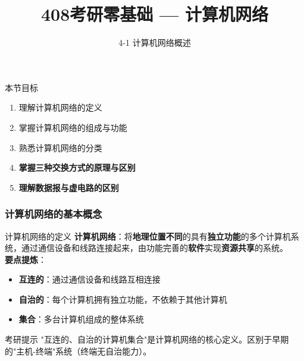 \documentclass[10pt, aspectratio=169]{beamer}
\title{408考研零基础 --- 计算机网络}
\subtitle{4-1 计算机网络概述}
\author{}
\date{}
\begin{document}
\begin{frame}{本节目标}
    \begin{enumerate}
        \item 理解计算机网络的定义
        \item 掌握计算机网络的组成与功能
        \item 熟悉计算机网络的分类
        \item \textbf{掌握三种交换方式{的}原理与区别}
        \item \textbf{理解数据报与虚电路{的}区别}
    \end{enumerate}
\end{frame}

\subsubsection{计算机网络的基本概念}
\begin{frame}{计算机网络的定义}
    \textbf{计算机网络}：将\textbf{地理位置不同}的具有\textbf{独立功能}的多个计算机系统，通过通信设备和线路连接起来，由功能完善的\textbf{软件}实现\textbf{资源共享}的系统。\\
    \vspace{0.5em}
    \textbf{要点提炼}：
    \begin{itemize}
        \item \textbf{互连的}：通过通信设备和线路互相连接
        \item \textbf{自治的}：每个计算机拥有独立功能，不依赖于其他计算机
        \item \textbf{集合}：多台计算机组成的整体系统
    \end{itemize}
    \vspace{0.5em}
    \begin{block}{考研提示}
        "互连的、自治的计算机集合"是计算机网络的核心定义。区别于早期的"主机-终端"系统（终端无自治能力）。
    \end{block}
\end{frame}
\end{document}
